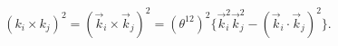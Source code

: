 \begin{equation}
  (k_i \times k_j)^2 = (\vec{k}_i \times \vec{k}_j)^2
  = (\theta^{12})^2 \{ \vec{k}_i^2 \vec{k}_j^2
                       - (\vec{k}_i \cdot \vec{k}_j)^2 \}.
\end{equation}

